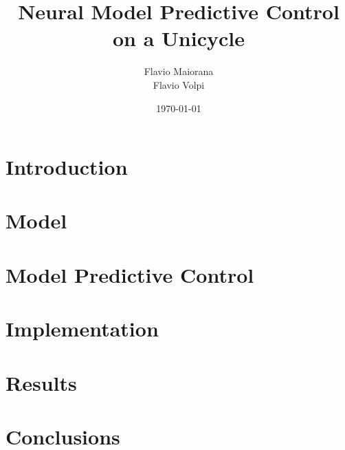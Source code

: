 \documentclass[a4paper, onecolumn, 12pt]{article}
\title{Neural Model Predictive Control on a Unicycle}
\author{Flavio Maiorana \\ Flavio Volpi}
\date{\today} %
\begin{document}

\newpage
\tableofcontents
\newpage

\todototoc
\listoftodos

\clearpage
\section{Introduction} 
\section{Model} 
\section{Model Predictive Control} 
\section{Implementation} 
\section{Results} 
\section{Conclusions} 



\end{document}
